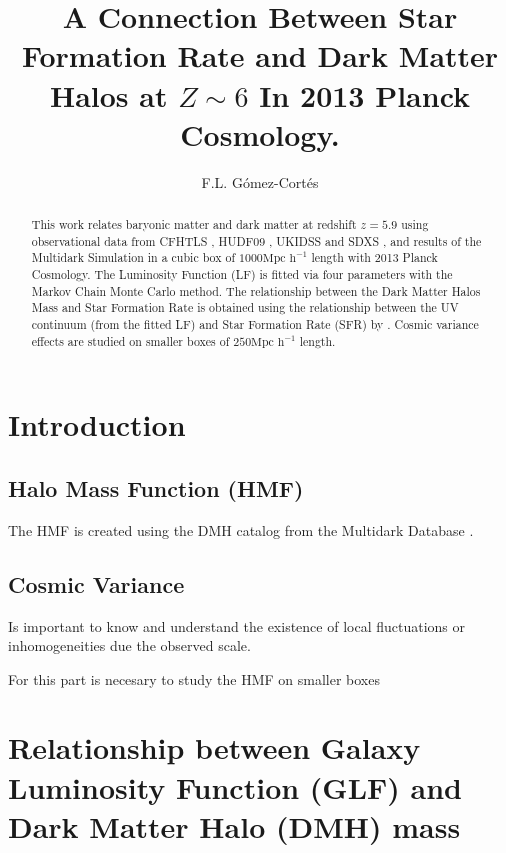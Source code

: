 \documentclass[manuscript]{aastex}
\begin{document}
\title{A Connection Between Star Formation Rate and Dark Matter Halos at $Z\sim6$ In 2013 Planck Cosmology.}

\author{F.L. G\'omez-Cort\'es }

\begin{abstract}
This work relates baryonic matter and dark matter at redshift $z=5.9$ using observational data
from CFHTLS \citep{willott13}, HUDF09 \citep{bouwens06,bouwens12}, UKIDSS and SDXS \citep{mclure09}, 
and results of the Multidark Simulation \citep{riebe13} in a cubic box of $1000 \textrm{Mpc h}^{-1}$ length
with 2013 Planck Cosmology. 
The Luminosity Function (LF) is fitted via four parameters with the Markov Chain Monte Carlo method.
The relationship between the Dark Matter Halos Mass and Star Formation Rate is obtained
using the relationship between the UV continuum (from the fitted LF) and Star Formation Rate (SFR) by \cite{kennicutt98}.
Cosmic variance effects are studied on smaller boxes of $250 \textrm{Mpc h}^{-1}$ length.

\end{abstract}

\section{Introduction}

  \subsection{Halo Mass Function (HMF)}
  
  The HMF is created using the DMH catalog from the Multidark Database \citep{riebe13}.
  
  
  \subsection{Cosmic Variance}
  
  Is important to know and understand the existence of local fluctuations
  or inhomogeneities due the observed scale.

  For this part is necesary to study the HMF on smaller boxes

\section{Relationship between Galaxy Luminosity Function (GLF) and
  Dark Matter Halo (DMH) mass}
\end{document}

